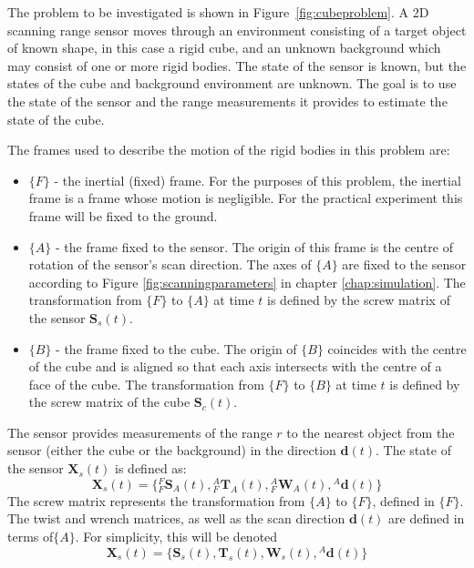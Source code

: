 The problem to be investigated is shown in Figure~\ref{fig:cubeproblem}. A 2D scanning range sensor moves through an environment consisting of a target object of known shape, in this case a rigid cube, and an unknown background which may consist of one or more rigid bodies. The state of the sensor is known, but the states of the cube and background environment are unknown. The goal is to use the state of the sensor and the range measurements it provides to estimate the state of the cube.

The frames used to describe the motion of the rigid bodies in this problem are:
\begin{itemize}
\item $\{F\}$ - the inertial (fixed) frame. For the purposes of this problem, the inertial frame is a frame whose motion is negligible. For the practical experiment this frame will be fixed to the ground.
\item $\{A\}$ - the frame fixed to the sensor. The origin of this frame is the centre of rotation of the sensor's scan direction. The axes of $\{A\}$ are fixed to the sensor according to Figure \ref{fig:scanningparameters} in chapter \ref{chap:simulation}. The transformation from $\{F\}$ to $\{A\}$ at time $t$ is defined by the screw matrix of the sensor $\mathbf{S}_{s}(t)$.
\item $\{B\}$ - the frame fixed to the cube. The origin of $\{B\}$ coincides with the centre of the cube and is aligned so that each axis intersects with the centre of a face of the cube. The transformation from $\{F\}$ to $\{B\}$ at time $t$ is defined by the screw matrix of the cube $\mathbf{S}_{c}(t)$.
\end{itemize} 

The sensor provides measurements of the range $r$ to the nearest object from the sensor (either the cube or the background) in the direction $\mathbf{d}(t)$. 
The state of the sensor $\mathbf{X}_{s}(t)$ is defined as:
\begin{equation}
	\mathbf{X}_{s}(t) = 
	\{{^{F}_{F}\mathbf{S}^{}_{A}(t)},{^{A}_{F}\mathbf{T}^{}_{A}(t)},{^{A}_{F}\mathbf{W}^{}_{A}(t)},
	{^{A}\mathbf{d}(t)}\}
\end{equation}
The screw matrix represents the transformation from $\{A\}$ to $\{F\}$, defined in $\{F\}$. The twist and wrench matrices, as well as the scan direction $\mathbf{d}(t)$ are defined in terms of$\{A\}$.
For simplicity, this will be denoted 
\begin{equation}
	\mathbf{X}_{s}(t) = 
	\{\mathbf{S}_{s}(t),\mathbf{T}_{s}(t),\mathbf{W}_{s}(t),{^{A}\mathbf{d}(t)}\}
\end{equation}

